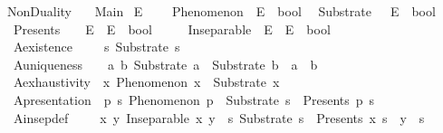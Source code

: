 %
\begin{isabellebody}%
%
%
\isadelimtheory
%
\endisadelimtheory
%
\isatagtheory
{}\isamarkupfalse%
\ NonDuality\isanewline
\ \ \ Main\isanewline
{}%
\endisatagtheory
{\isafoldtheory}%
%
\isadelimtheory
%
\endisadelimtheory
%
\isadelimdocument
%
\endisadelimdocument
%
\isatagdocument
%
\isamarkuptrue%
%
\endisatagdocument
{\isafolddocument}%
%
\isadelimdocument
%
\endisadelimdocument
{}\isamarkupfalse%
\ E\ \ \isanewline
\isanewline
{}\isamarkupfalse%
\isanewline
\ \ Phenomenon\ {\isacharcolon}{\kern0pt}{\isacharcolon}{\kern0pt}\ {\isachardoublequoteopen}E\ {\isasymRightarrow}\ bool{\isachardoublequoteclose}\isanewline
\ \ Substrate\ \ {\isacharcolon}{\kern0pt}{\isacharcolon}{\kern0pt}\ {\isachardoublequoteopen}E\ {\isasymRightarrow}\ bool{\isachardoublequoteclose}\isanewline
\ \ Presents\ \ \ {\isacharcolon}{\kern0pt}{\isacharcolon}{\kern0pt}\ {\isachardoublequoteopen}E\ {\isasymRightarrow}\ E\ {\isasymRightarrow}\ bool{\isachardoublequoteclose}\ \ \ \isanewline
\ \ Inseparable\ {\isacharcolon}{\kern0pt}{\isacharcolon}{\kern0pt}\ {\isachardoublequoteopen}E\ {\isasymRightarrow}\ E\ {\isasymRightarrow}\ bool{\isachardoublequoteclose}\isanewline
\isanewline
{}\isamarkupfalse%
\ \isanewline
\ \ A{}{\isacharunderscore}{\kern0pt}existence{\isacharcolon}{\kern0pt}\ \ \ \ \ {\isachardoublequoteopen}{\isasymexists}s{\isachardot}{\kern0pt}\ Substrate\ s{\isachardoublequoteclose}\ \isanewline
\ \ A{}{\isacharunderscore}{\kern0pt}uniqueness{\isacharcolon}{\kern0pt}\ \ \ \ {\isachardoublequoteopen}{\isasymforall}a\ b{\isachardot}{\kern0pt}\ Substrate\ a\ {\isasymlongrightarrow}\ Substrate\ b\ {\isasymlongrightarrow}\ a\ {\isacharequal}{\kern0pt}\ b{\isachardoublequoteclose}\ \isanewline
\ \ A{}{\isacharunderscore}{\kern0pt}exhaustivity{\isacharcolon}{\kern0pt}\ \ {\isachardoublequoteopen}{\isasymforall}x{\isachardot}{\kern0pt}\ Phenomenon\ x\ {\isasymor}\ Substrate\ x{\isachardoublequoteclose}\ \isanewline
\ \ A{}{\isacharunderscore}{\kern0pt}presentation{\isacharcolon}{\kern0pt}\ \ {\isachardoublequoteopen}{\isasymforall}p\ s{\isachardot}{\kern0pt}\ Phenomenon\ p\ {\isasymand}\ Substrate\ s\ {\isasymlongrightarrow}\ Presents\ p\ s{\isachardoublequoteclose}\ \isanewline
\ \ A{}{\isacharunderscore}{\kern0pt}insep{\isacharunderscore}{\kern0pt}def{\isacharcolon}{\kern0pt}\ \ \ \ \ {\isachardoublequoteopen}{\isasymforall}x\ y{\isachardot}{\kern0pt}\ Inseparable\ x\ y\ {\isasymlongleftrightarrow}\ {\isacharparenleft}{\kern0pt}{\isasymexists}s{\isachardot}{\kern0pt}\ Substrate\ s\ {\isasymand}\ Presents\ x\ s\ {\isasymand}\ y\ {\isacharequal}{\kern0pt}\ s{\isacharparenright}{\kern0pt}{\isachardoublequoteclose}\isanewline

\end{isabellebody}
